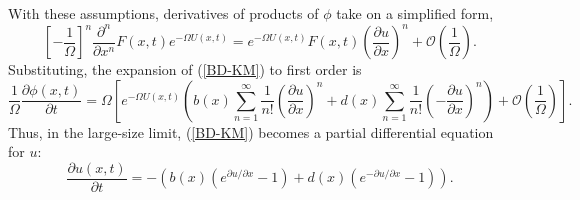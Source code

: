 \documentclass[review]{elsarticle}
\begin{document}
With these assumptions,
derivatives of products of $\phi$ take on a simplified form,
\begin{dmath*}
\left[-\frac{1}{\Omega}\right]^n\frac{\partial^n}{\partial x^n}F(x,t)e^{-\Omega U(x,t)} =
  e^{-\Omega U(x,t)}F(x,t)\left(\frac{\partial u}{\partial x}\right)^n + \mathcal{O}\left(\frac1\Omega\right).
\end{dmath*}
Substituting, the expansion of (\ref{BD-KM}) to first order is
\begin{dmath*}
\frac1\Omega \frac{\partial \phi(x,t)}{\partial t}
 = \Omega \left[ e^{-\Omega U(x,t)} \left( b(x) \sum_{n=1}^\infty \frac1{n!} \left(\frac{\partial u}{\partial x}\right)^n + d(x) \sum_{n=1}^\infty \frac1{n!} \left(-\frac{\partial u}{\partial x}\right)^n \right) + \mathcal{O}\left(\frac1\Omega\right) \right].
\end{dmath*}
Thus, in the large-size limit,
(\ref{BD-KM}) becomes
a partial differential equation for $u$:
\begin{dmath}[label=BD-HJ]
\frac{\partial u(x,t)}{\partial t} = - \left( b(x) \left(e^{{\partial u}/{\partial x}}-1\right) + d(x) \left(e^{-{\partial u}/{\partial x}}-1\right) \right).
\end{dmath}
\end{document}

